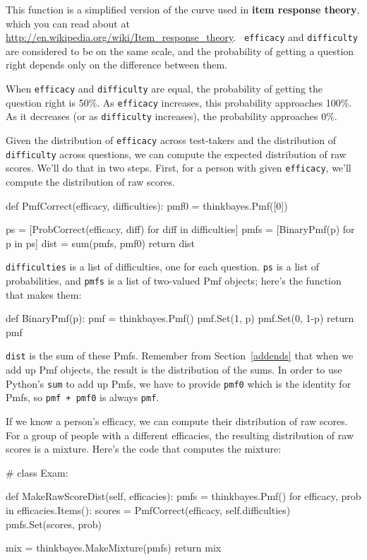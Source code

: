 \documentclass[12pt]{book}
\theoremstyle{exercise}
\begin{document}
This function is a simplified version of the curve used in {\bf item
response theory}, which you can read about at
\url{http://en.wikipedia.org/wiki/Item_response_theory}.  {\tt
  efficacy} and {\tt difficulty} are considered to be on the same
scale, and the probability of getting a question right depends only on
the difference between them.

When {\tt efficacy} and {\tt difficulty} are equal, the
probability of getting the question right is 50\%.  As
{\tt efficacy} increases, this probability approaches 100\%.
As it decreases (or as {\tt difficulty} increases), the
probability approaches 0\%.

Given the distribution of {\tt efficacy} across test-takers
and the distribution of {\tt difficulty} across questions, we
can compute the expected distribution of raw scores.  We'll do that
in two steps.  First, for a person with given {\tt efficacy},
we'll compute the distribution of raw scores.

\begin{code}
def PmfCorrect(efficacy, difficulties):
    pmf0 = thinkbayes.Pmf([0])

    ps = [ProbCorrect(efficacy, diff) for diff in difficulties]
    pmfs = [BinaryPmf(p) for p in ps]
    dist = sum(pmfs, pmf0)
    return dist
\end{code}

{\tt difficulties} is a list of difficulties, one for each question.
{\tt ps} is a list of probabilities, and {\tt pmfs} is a list of
two-valued Pmf objects; here's the function that makes them:

\begin{code}
def BinaryPmf(p):
    pmf = thinkbayes.Pmf()
    pmf.Set(1, p)
    pmf.Set(0, 1-p)
    return pmf
\end{code}

{\tt dist} is the sum of these Pmfs.  Remember from Section~\ref{addends}
that when we add up Pmf objects, the result is the distribution
of the sums.  In order to use Python's {\tt sum} to add up Pmfs,
we have to provide {\tt pmf0} which is the identity for Pmfs,
so {\tt pmf + pmf0} is always {\tt pmf}.

If we know a person's efficacy, we can compute their distribution
of raw scores.  For a group of people with a different efficacies, the
resulting distribution of raw scores is a mixture.  Here's the code
that computes the mixture:

\begin{code}
# class Exam:

    def MakeRawScoreDist(self, efficacies):
        pmfs = thinkbayes.Pmf()
        for efficacy, prob in efficacies.Items():
            scores = PmfCorrect(efficacy, self.difficulties)
            pmfs.Set(scores, prob)

        mix = thinkbayes.MakeMixture(pmfs)
        return mix
\end{code}
\end{document}
